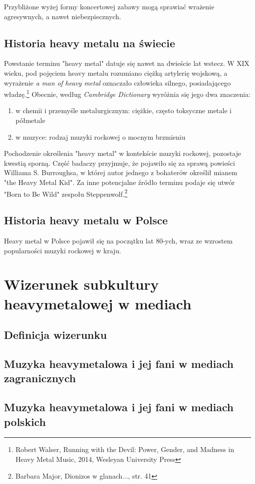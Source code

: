 \documentclass[12pt, a4paper, titlepage]{report}
\begin{document}
Przybliżone wyżej formy koncertowej zabawy mogą sprawiać wrażenie agresywnych, a nawet niebezpiecznych. 

\section{Historia heavy metalu na świecie}
Powstanie terminu "heavy metal" datuje się nawet na dwieście lat wstecz. W XIX wieku, pod pojęciem heavy metalu rozumiano ciężką artylerię wojskową, a wyrażenie \textit{a man of heavy metal} oznaczało człowieka silnego, posiadającego władzę.\footnote{Robert Walser, Running with the Devil: Power, Gender, and Madness in Heavy Metal Music, 2014, Wesleyan University Press}  Obecnie, według \textit{Cambridge Dictionary} wyróżnia się jego dwa znaczenia: 
\begin{enumerate}
\item w chemii i przemyśle metalurgicznym: ciężkie, często toksyczne metale  i półmetale
\item w muzyce: rodzaj muzyki rockowej o mocnym brzmieniu
\end{enumerate}
Pochodzenie określenia "heavy metal" w kontekście muzyki rockowej, pozostaje kwestią sporną. Część badaczy przyjmuje, że pojawiło się za sprawą powieści Williama S. Burroughsa, w której autor jednego z bohaterów określił mianem "the Heavy Metal Kid". Za inne potencjalne źródło terminu podaje się utwór "Born to Be Wild" zespołu Steppenwolf.\footnote{Barbara Major, Dionizos w glanach..., str. 41} 

\section{Historia heavy metalu w Polsce}
Heavy metal w Polsce pojawił się na początku lat 80-ych, wraz ze wzrostem popularności muzyki rockowej w kraju. %
\chapter{Wizerunek subkultury heavymetalowej w mediach}
\section{Definicja wizerunku}
\section{Muzyka heavymetalowa i jej fani w mediach zagranicznych}
\section{Muzyka heavymetalowa i jej fani w mediach polskich}
\end{document}
